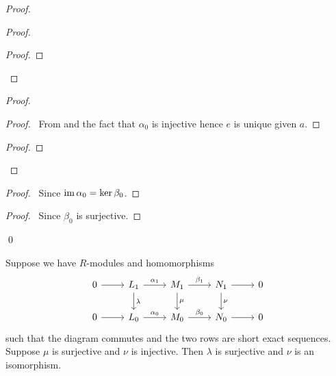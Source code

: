 \begin{proof}
\begin{proof}
\begin{proof}
	\end{proof}
\end{proof}
\begin{proof}
	\begin{proof}
		\pf\ From  and the fact that $\alpha_0$ is injective hence $e$ is unique given $a$.
	\end{proof}
	\begin{proof}
	\end{proof}
\end{proof}
\begin{proof}
	\pf\ Since $\operatorname{im} \alpha_0 = \ker \beta_0$.
\end{proof}
\begin{proof}
	\pf\ Since $\beta_0$ is surjective.
\end{proof}
\qed
\end{proof}

\begin{cor}
Suppose we have $R$-modules and homomorphisms
\[ \begin{tikzcd}
0 \arrow[r] & L_1 \arrow[r,"\alpha_1"] \arrow[d,"\lambda"] & M_1 \arrow[r,"\beta_1"] \arrow[d,"\mu"] & N_1 \arrow[r] \arrow[d,"\nu"] & 0 \\
0 \arrow[r] & L_0 \arrow[r,"\alpha_0"] & M_0 \arrow[r,"\beta_0"] & N_0 \arrow[r] & 0
\end{tikzcd} \]
such that the diagram commutes and the two rows are short exact sequences. Suppose $\mu$ is surjective and $\nu$ is injective. Then $\lambda$ is surjective and $\nu$ is an isomorphism.
\end{cor}

